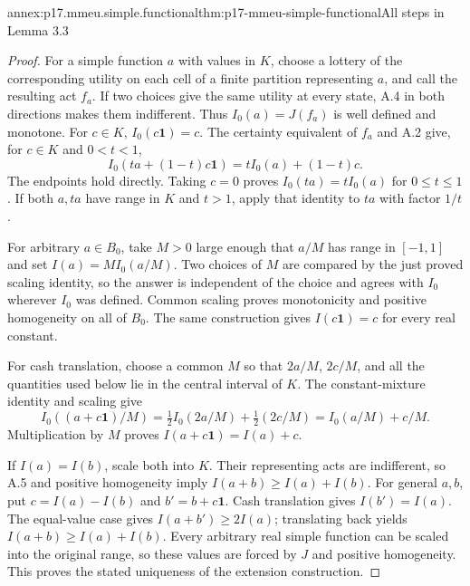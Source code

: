 \begin{annexitem}{annex:p17.mmeu.simple.functional}{thm:p17-mmeu-simple-functional}{All steps in Lemma 3.3}
\begin{proof}
For a simple function \(a\) with values in \(K\),
choose a lottery of the corresponding utility
on each cell of a finite partition representing
\(a\), and call the resulting act \(f_a\).
If two choices give the same utility at every
state, A.4 in both directions makes them
indifferent. Thus \(I_0(a)=J(f_a)\) is
well defined and monotone.
For \(c\in K\), \(I_0(c\mathbf1)=c\).
The certainty equivalent of \(f_a\) and A.2
give, for \(c\in K\) and \(0<t<1\),
\[
       I_0(ta+(1-t)c\mathbf1)=tI_0(a)+(1-t)c.
\]
The endpoints hold directly. Taking \(c=0\)
proves \(I_0(ta)=tI_0(a)\) for \(0\leq t\leq1\).
If both \(a,ta\) have range in \(K\) and \(t>1\),
apply that identity to \(ta\) with factor \(1/t\).

For arbitrary \(a\in B_0\), take \(M>0\) large
enough that \(a/M\) has range in \([-1,1]\)
and set \(I(a)=M I_0(a/M)\).
Two choices of \(M\) are compared by the just
proved scaling identity, so the answer is
independent of the choice and agrees with
\(I_0\) wherever \(I_0\) was defined.
Common scaling proves monotonicity and
positive homogeneity on all of \(B_0\).
The same construction gives \(I(c\mathbf1)=c\)
for every real constant.

For cash translation, choose a common \(M\)
so that \(2a/M\), \(2c/M\), and all the
quantities used below lie in the central
interval of \(K\). The constant-mixture identity
and scaling give
\[
 I_0((a+c\mathbf1)/M)
       =\tfrac12 I_0(2a/M)+\tfrac12(2c/M)
       =I_0(a/M)+c/M.
\]
Multiplication by \(M\) proves
\(I(a+c\mathbf1)=I(a)+c\).

If \(I(a)=I(b)\), scale both into \(K\).
Their representing acts are indifferent, so
A.5 and positive homogeneity imply
\(I(a+b)\geq I(a)+I(b)\).
For general \(a,b\), put
\(c=I(a)-I(b)\) and \(b'=b+c\mathbf1\).
Cash translation gives \(I(b')=I(a)\).
The equal-value case gives
\(I(a+b')\geq2I(a)\); translating back yields
\(I(a+b)\geq I(a)+I(b)\).
Every arbitrary real simple function can be
scaled into the original range, so these
values are forced by \(J\) and positive
homogeneity. This proves the stated uniqueness
of the extension construction.
\end{proof}
\end{annexitem}

